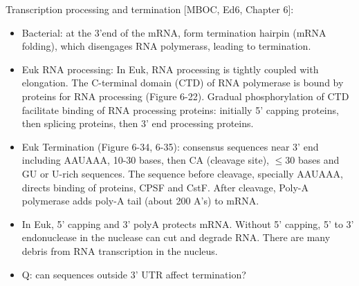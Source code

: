 \documentclass{report}
\begin{document}
Transcription processing and termination [MBOC, Ed6, Chapter 6]: 
\begin{itemize}
	\item Bacterial: at the 3'end of the mRNA, form termination hairpin (mRNA folding), which disengages RNA polymerass, leading to termination. 
	
	\item Euk RNA processing: In Euk, RNA processing is tightly coupled with elongation. The C-terminal domain (CTD) of RNA polymerase is bound by proteins for RNA processing (Figure 6-22). Gradual phosphorylation of CTD facilitate binding of RNA processing proteins: initially 5' capping proteins, then splicing proteins, then 3' end processing proteins. 
	
	\item Euk Termination (Figure 6-34, 6-35): consensus sequences near 3' end including AAUAAA, 10-30 bases, then CA (cleavage site), $\leq 30$ bases and GU or U-rich sequences. The sequence before cleavage, specially AAUAAA, directs binding of proteins, CPSF and CstF. After cleavage, Poly-A polymerase adds poly-A tail (about 200 A's) to mRNA. 
	
	\item In Euk, 5' capping and 3' polyA protects mRNA. Without 5' capping, 5' to 3' endonuclease in the nuclease can cut and degrade RNA. There are many debris from RNA transcription in the nucleus. 
	
	\item Q: can sequences outside 3' UTR affect termination? 
\end{itemize}
\end{document}
